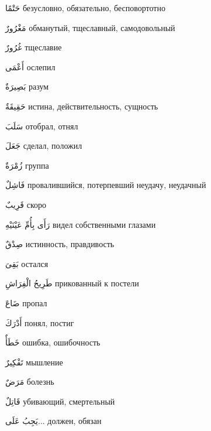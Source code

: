 \documentclass[a5paper]{article}
\newcommand\textstyleDropCaps[1]{#1}
\newcommand\textstyleCaptioncharacters[1]{#1}
\begin{document}
\textstyleCaptioncharacters{حَتْمًا }\textstyleDropCaps{безусловно, обяза­тельно, бесповортотно‎}

\textstyleCaptioncharacters{مَغْرُورٌ }\textstyleDropCaps{обманутый, тще­славный, самодовольный‎}

\textstyleCaptioncharacters{غُرُورٌ }\textstyleDropCaps{тщеславие‎}

\textstyleCaptioncharacters{أَعْمَى }\textstyleDropCaps{ослепил‎}

\textstyleCaptioncharacters{بَصِيرَةٌ }\textstyleDropCaps{разум‎}

\textstyleCaptioncharacters{حَقِيقَةٌ }\textstyleDropCaps{истина, действи­тельность, сущность‎}

\textstyleCaptioncharacters{سَلَبَ }\textstyleDropCaps{отобрал, отнял‎}

\textstyleCaptioncharacters{جَعَلَ }\textstyleDropCaps{сделал, положил‎}

\textstyleCaptioncharacters{زُمْرَةٌ }\textstyleDropCaps{группа‎}

\textstyleCaptioncharacters{فَاشِلٌ }\textstyleDropCaps{провалившийся, по­терпевший неудачу, неудачный‎}

\textstyleCaptioncharacters{قَرِيبٌ }\textstyleDropCaps{скоро‎}

\textstyleCaptioncharacters{رَأَى بِأُمِّ عَيْنَيْهِ }\textstyleDropCaps{видел собственными глазами‎}

\textstyleCaptioncharacters{صِدْقٌ }\textstyleDropCaps{истинность, прав­дивость‎}

\textstyleCaptioncharacters{بَقِىَ }\textstyleDropCaps{остался‎}

\textstyleCaptioncharacters{طَرِيحُ الْفِرَاشِ }\textstyleDropCaps{прико­ванный к постели‎}

\textstyleCaptioncharacters{ضَاعَ }\textstyleDropCaps{пропал‎}

\textstyleCaptioncharacters{أَدْرَكَ }\textstyleDropCaps{понял, постиг‎}

\textstyleCaptioncharacters{خَطَأٌ }\textstyleDropCaps{ошибка, ошибоч­ность‎}

\textstyleCaptioncharacters{تَفْكِيرٌ }\textstyleDropCaps{мышление‎}

\textstyleCaptioncharacters{مَرَضٌ }\textstyleDropCaps{болезнь‎}

\textstyleCaptioncharacters{قَاتِلٌ }\textstyleDropCaps{убивающий, смер­тельный‎}

\textstyleCaptioncharacters{يَجِبُ عَلَى... }\textstyleDropCaps{должен, обязан‎}
\end{document}
